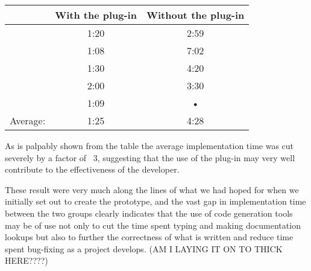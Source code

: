 \begin{tabular}{|c|c|c|}
\hline 
& With the plug-in & Without the plug-in \\ 
\hline 
& 1:20 & 2:59 \\ 
\hline 
& 1:08 & 7:02 \\ 
\hline 
& 1:30 & 4:20 \\ 
\hline 
& 2:00 & 3:30 \\ 
\hline 
 & 1:09 & • \\ 
\hline
Average: & 1:25 & 4:28
\end{tabular} 

As is palpably shown from the table the average implementation time was cut severely by a factor of ~3, suggesting that the use of the plug-in may very well contribute to the effectiveness of the developer.

These result were very much along the lines of what we had hoped for when we initially set out to create the prototype, and the vast gap in implementation time between the two groups clearly indicates that the use of code generation tools may be of use not only to cut the time spent typing and making documentation lookups but also to further the correctness of what is written and reduce time spent bug-fixing as a project develops. (AM I LAYING IT ON TO THICK HERE????)  









